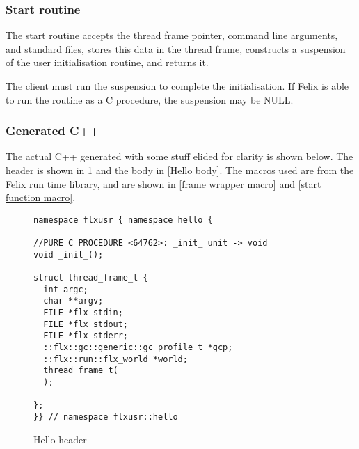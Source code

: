 \documentclass[oneside]{book}
\begin{document}
\subsubsection{Start routine}
The start routine accepts the thread frame pointer,
command line arguments, and standard files, stores
this data in the thread frame, constructs a suspension
of the user initialisation routine, and returns it.

The client must run the suspension to complete the initialisation.
If Felix is able to run the routine as a C procedure, the suspension
may be NULL.

\subsubsection{Generated C++}
The actual C++ generated with some stuff elided for clarity is shown below.
The header is shown in \ref{Hello header} and the body in \ref{Hello body}.
The macros used are from the Felix run time library, and are
shown in \ref{frame wrapper macro}
and \ref{start function macro}.


\begin{figure}[p]
\caption{Hello header\label{Hello header}}
\begin{verbatim}
namespace flxusr { namespace hello {

//PURE C PROCEDURE <64762>: _init_ unit -> void
void _init_();

struct thread_frame_t {
  int argc;
  char **argv;
  FILE *flx_stdin;
  FILE *flx_stdout;
  FILE *flx_stderr;
  ::flx::gc::generic::gc_profile_t *gcp;
  ::flx::run::flx_world *world;
  thread_frame_t(
  );

};
}} // namespace flxusr::hello
\end{verbatim}
\end{figure}
\end{document}
